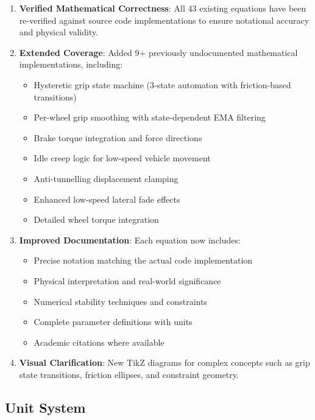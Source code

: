 \begin{enumerate}
  \item \textbf{Verified Mathematical Correctness}: All 43 existing equations have been re-verified against source code implementations to ensure notational accuracy and physical validity.

  \item \textbf{Extended Coverage}: Added 9+ previously undocumented mathematical implementations, including:
    \begin{itemize}
      \item Hysteretic grip state machine (3-state automaton with friction-based transitions)
      \item Per-wheel grip smoothing with state-dependent EMA filtering
      \item Brake torque integration and force directions
      \item Idle creep logic for low-speed vehicle movement
      \item Anti-tunnelling displacement clamping
      \item Enhanced low-speed lateral fade effects
      \item Detailed wheel torque integration
    \end{itemize}

  \item \textbf{Improved Documentation}: Each equation now includes:
    \begin{itemize}
      \item Precise notation matching the actual code implementation
      \item Physical interpretation and real-world significance
      \item Numerical stability techniques and constraints
      \item Complete parameter definitions with units
      \item Academic citations where available
    \end{itemize}

  \item \textbf{Visual Clarification}: New TikZ diagrams for complex concepts such as grip state transitions, friction ellipses, and constraint geometry.
\end{enumerate}

\subsection*{Unit System}

